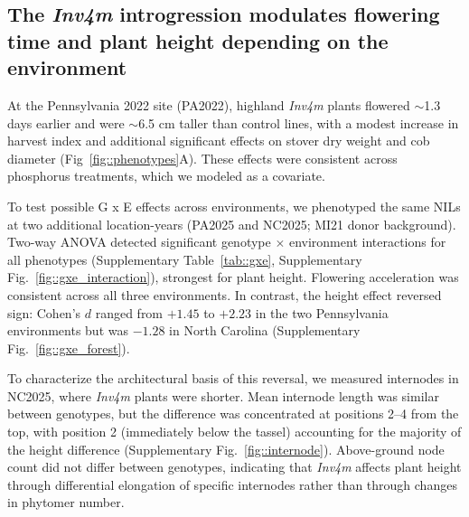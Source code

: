 \documentclass[9pt,twocolumn,twoside]{rilabRxiv}
\newcommand{\invfour}{\textit{Inv4m}\xspace}
\begin{document}


\subsection{The \invfour introgression modulates flowering time and plant height depending on the environment}
At the Pennsylvania 2022 site (PA2022), highland \invfour plants flowered $\sim$1.3 days earlier and were $\sim$6.5 cm taller than control lines, with a modest increase in harvest index and additional significant effects on stover dry weight and cob diameter (Fig~\ref{fig::phenotypes}A). These effects were consistent across phosphorus treatments, which we modeled as a covariate.

To test possible G x E effects across environments, we phenotyped the same NILs at two additional location-years (PA2025 and NC2025; MI21 donor background). Two-way ANOVA detected significant genotype $\times$ environment interactions for all phenotypes (Supplementary Table~\ref{tab::gxe}, Supplementary Fig.~\ref{fig::gxe_interaction}), strongest for plant height. 
Flowering acceleration was consistent across all three environments. 
In contrast, the height effect reversed sign: Cohen's $d$ ranged from $+1.45$ to $+2.23$ in the two Pennsylvania environments but was $-1.28$ in North Carolina (Supplementary Fig.~\ref{fig::gxe_forest}).

To characterize the architectural basis of this reversal, we measured internodes in NC2025, where \invfour plants were shorter. 
Mean internode length was similar between genotypes, but the difference was concentrated at positions 2--4 from the top, with position 2 (immediately below the tassel) accounting for the majority of the height difference (Supplementary Fig.~\ref{fig::internode}).
Above-ground node count did not differ between genotypes, indicating that \invfour affects plant height through differential elongation of specific internodes rather than through changes in phytomer number.
\end{document}
